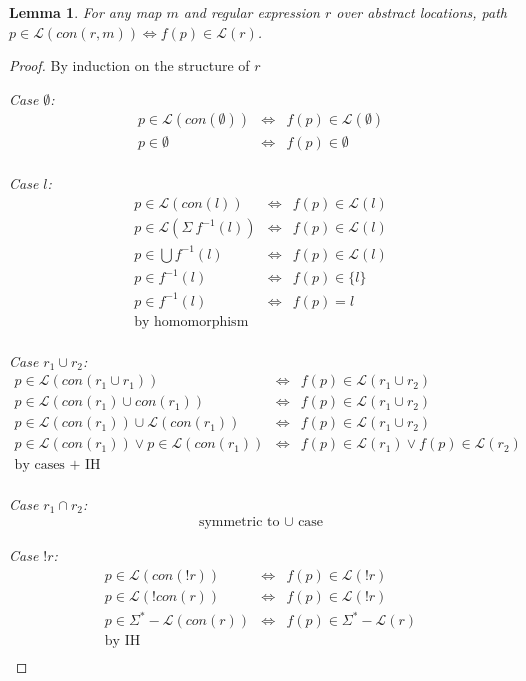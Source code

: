 \documentclass[twocolumn]{sig-alternate-10pt}
\newtheorem{lem}[thm]{Lemma}
\begin{document}
\newcommand{\Lang}{\ensuremath{\mathcal{L}}}



\begin{lem}
  For any map $m$ and regular expression $r$ over abstract locations, path $p \in \Lang(con(r,m)) \iff f(p) \in \Lang(r)$.
\end{lem}
\begin{proof}
By induction on the structure of $r$

\emph{Case $\emptyset$:}
  \[ \begin{array}{lll}
    p \in \Lang(con(\emptyset)) &\iff& f(p) \in \Lang(\emptyset) \\
    p \in \emptyset &\iff& f(p) \in \emptyset \\
  \end{array} \]

\emph{Case $l$:}
  \[ \begin{array}{lll}
    p \in \Lang(con(l)) &\iff& f(p) \in \Lang(l) \\
    p \in \Lang(\Sigma ~ f^{-1}(l)) &\iff& f(p) \in \Lang(l) \\
    p \in \bigcup f^{-1}(l) &\iff& f(p) \in \Lang(l) \\
    p \in f^{-1}(l) &\iff& f(p) \in \{ l \} \\
    p \in f^{-1}(l) &\iff& f(p) = l \\
    \text{by homomorphism} & & \\
  \end{array} \]

\emph{Case $r_1 \cup r_2$:}
  \[ \begin{array}{lll}
    p \in \Lang(con(r_1 \cup r_1)) &\iff& f(p) \in \Lang(r_1 \cup r_2) \\
    p \in \Lang(con(r_1) \cup con(r_1)) &\iff& f(p) \in \Lang(r_1 \cup r_2) \\
    p \in \Lang(con(r_1)) \cup \Lang(con(r_1)) &\iff& f(p) \in \Lang(r_1 \cup r_2) \\
    p \in \Lang(con(r_1)) \vee p \in \Lang(con(r_1)) 
       &\iff& 
       f(p) \in \Lang(r_1) \vee f(p) \in \Lang(r_2) \\
    \text{by cases + IH} & & \\
  \end{array} \]

\emph{Case $r_1 \cap r_2$:} 
  \[ \begin{array}{c}
    \text{symmetric to } \cup \text{ case}
  \end{array} \]

\emph{Case $!r$:}
  \[ \begin{array}{lll}
    p \in \Lang(con(!r)) &\iff& f(p) \in \Lang(!r) \\
    p \in \Lang(!con(r)) &\iff& f(p) \in \Lang(!r) \\
    p \in \Sigma^* - \Lang(con(r)) &\iff& f(p) \in \Sigma^* - \Lang(r) \\
    \text{by IH} & & \\
  \end{array} \]


\end{proof}
\end{document}
